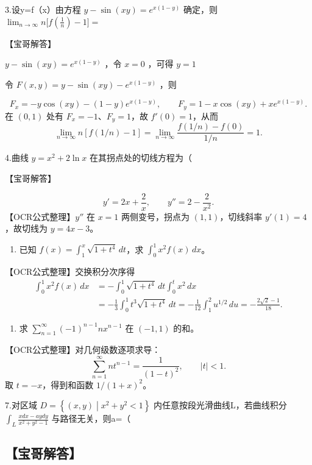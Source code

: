 \documentclass[11pt,fontset=fandol]{ctexart}
\providecommand{\tightlist}{\setlength{\itemsep}{0pt}\setlength{\parskip}{0pt}}
\begin{document}
3.设y=f（x）由方程 \(y - \sin ( x y ) = e ^ { x ( 1 - y ) }\) 确定，则
\(\lim _ { n \to \infty } n \biggl [ f ( \frac { 1 } { n } ) - 1 \biggr ] =\)

【宝哥解答】

\(y - \sin ( x y ) = e ^ { x ( 1 - y ) }\) ，令 \(x = 0\) ，可得
\(y = 1\)

令 \(F ( x , y ) = y - \sin ( x y ) - e ^ { x ( 1 - y ) }\) ，则

\[
F_x=-y\cos(xy)-(1-y)e^{x(1-y)},\qquad
F_y=1-x\cos(xy)+xe^{x(1-y)}.
\] 在 \((0,1)\) 处有 \(F_x=-1\)、\(F_y=1\)，故 \(f'(0)=1\)，从而 \[
\lim_{n\to\infty}n[f(1/n)-1]
=\lim_{n\to\infty}\frac{f(1/n)-f(0)}{1/n}=1.
\]

4.曲线 \(y = x ^ { 2 } + 2 \ln x\) 在其拐点处的切线方程为（

【宝哥解答】

\[
y'=2x+\frac2x,\qquad y''=2-\frac2{x^2}.
\] 【OCR公式整理】\(y''\) 在 \(x=1\) 两侧变号，拐点为
\((1,1)\)，切线斜率 \(y'(1)=4\)，故切线为 \(y=4x-3\)。

\begin{enumerate}
\def\labelenumi{\arabic{enumi}.}
\setcounter{enumi}{4}
\tightlist
\item
  已知 \(f(x)=\int_1^x\sqrt{1+t^4}\,dt\)，求 \(\int_0^1x^2f(x)\,dx\)。
\end{enumerate}

【OCR公式整理】交换积分次序得 \[
\begin{aligned}
\int_0^1x^2f(x)\,dx
&=-\int_0^1\sqrt{1+t^4}\,dt\int_0^t x^2\,dx\\
&=-\frac13\int_0^1t^3\sqrt{1+t^4}\,dt
=-\frac1{12}\int_1^2u^{1/2}\,du
=-\frac{2\sqrt2-1}{18}.
\end{aligned}
\]

\begin{enumerate}
\def\labelenumi{\arabic{enumi}.}
\setcounter{enumi}{5}
\tightlist
\item
  求 \(\sum_{n=1}^\infty(-1)^{n-1}nx^{n-1}\) 在 \((-1,1)\) 的和。
\end{enumerate}

【OCR公式整理】对几何级数逐项求导： \[
\sum_{n=1}^\infty nt^{n-1}=\frac1{(1-t)^2},\qquad |t|<1.
\] 取 \(t=-x\)，得到和函数 \(1/(1+x)^2\)。

7.对区域
\(D = \left\{ ( x , y ) \middle | x ^ { 2 } + y ^ { 2 } < 1 \right\}\)
内任意按段光滑曲线L，若曲线积分
\(\int _ { L } \frac { x d x - a y d y } { x ^ { 2 } + y ^ { 2 } - 1 }\)
与路径无关，则a=（

\subsection{【宝哥解答】}\label{ux5b9dux54e5ux89e3ux7b54}
\end{document}
